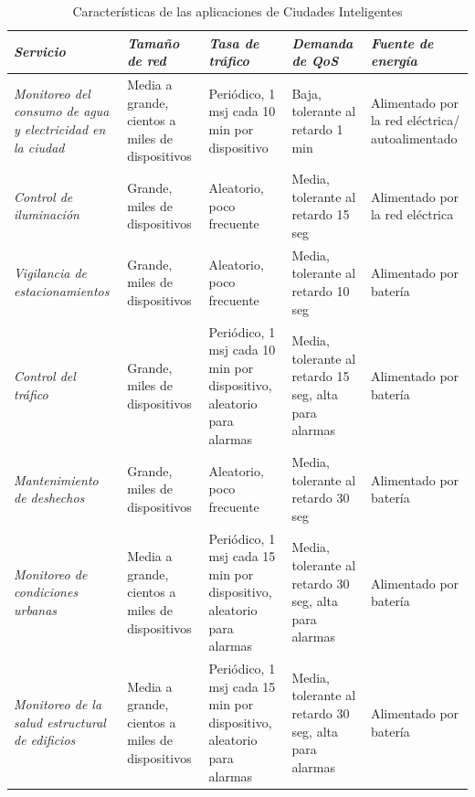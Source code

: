 \begin{table}
\caption{Características de las aplicaciones de Ciudades Inteligentes}
\label{tab:smartcity}
\centering
\begin{tabular}{*{5}{m{3cm}}}\\
\textbf{\textit{Servicio}} & \textbf{\textit{Tamaño de red}} & \textbf{\textit{Tasa de tráfico}} & \textbf{\textit{Demanda de QoS}} & \textbf{\textit{Fuente de energía}} \\ \hline \hline
\textit{Monitoreo del consumo de agua y electricidad en la ciudad} & \footnotesize{Media a grande, cientos a miles de dispositivos} & \footnotesize{Periódico, 1 msj cada 10 min por dispositivo} & \footnotesize{Baja, tolerante al retardo 1 min} & \footnotesize{Alimentado por la red eléctrica/ autoalimentado} \\ \hline
\textit{Control de iluminación} & \footnotesize{Grande, miles de dispositivos} & \footnotesize{Aleatorio, poco frecuente} & \footnotesize{Media, tolerante al retardo 15 seg} & \footnotesize{Alimentado por la red eléctrica }\\ \hline
\textit{Vigilancia de estacionamientos} & \footnotesize{Grande, miles de dispositivos} & \footnotesize{Aleatorio, poco frecuente} & \footnotesize{Media, tolerante al retardo 10 seg} & \footnotesize{Alimentado por batería }\\ \hline
\textit{Control del tráfico} & \footnotesize{Grande, miles de dispositivos} & \footnotesize{Periódico, 1 msj cada 10 min por dispositivo, aleatorio para alarmas} & \footnotesize{Media, tolerante al retardo 15 seg, alta para alarmas} & \footnotesize{Alimentado por batería} \\ \hline
\textit{Mantenimiento de deshechos} & \footnotesize{Grande, miles de dispositivos} & \footnotesize{Aleatorio, poco frecuente} & \footnotesize{Media, tolerante al retardo 30 seg} & \footnotesize{Alimentado por batería }\\ \hline
\textit{Monitoreo de condiciones urbanas} & \footnotesize{Media a grande, cientos a miles de dispositivos} & \footnotesize{Periódico, 1 msj cada 15 min por dispositivo, aleatorio para alarmas} & \footnotesize{Media, tolerante al retardo 30 seg, alta para alarmas} & \footnotesize{Alimentado por batería }\\ \hline
\textit{Monitoreo de la salud estructural de edificios} & \footnotesize{Media a grande, cientos a miles de dispositivos} & \footnotesize{Periódico, 1 msj cada 15 min por dispositivo, aleatorio para alarmas} & \footnotesize{Media, tolerante al retardo 30 seg, alta para alarmas} & \footnotesize{Alimentado por batería} \\ 
\end{tabular}
\end{table}

